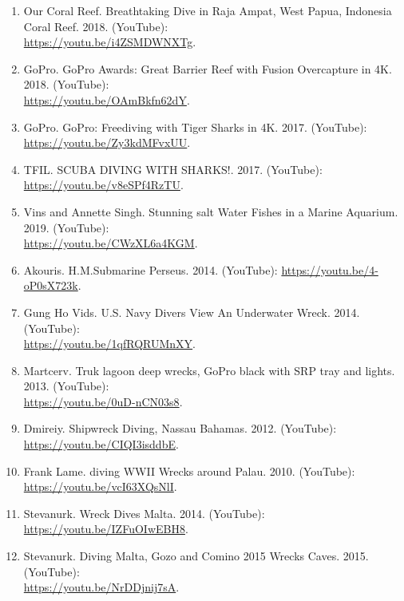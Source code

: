 \documentclass[10pt,twocolumn,letterpaper]{article}
\begin{document}
{\begin{enumerate}
    \item Our Coral Reef. Breathtaking Dive in Raja Ampat, West Papua, Indonesia Coral Reef. 2018. (YouTube): \\
    \url{https://youtu.be/i4ZSMDWNXTg}.
    
    \item GoPro. GoPro Awards: Great Barrier Reef with Fusion Overcapture in 4K. 2018. (YouTube): \\
    \url{https://youtu.be/OAmBkfn62dY}.
    
    \item GoPro. GoPro: Freediving with Tiger Sharks in 4K. 2017. (YouTube): 
    \url{https://youtu.be/Zy3kdMFvxUU}.
    \item TFIL. SCUBA DIVING WITH SHARKS!. 2017. (YouTube):
    \url{https://youtu.be/v8eSPf4RzTU}.
    
    \item Vins and Annette Singh. Stunning salt Water Fishes in a Marine Aquarium. 2019. (YouTube): \\
    \url{https://youtu.be/CWzXL6a4KGM}.
    
\item Akouris. H.M.Submarine Perseus. 2014. (YouTube):
    \url{https://youtu.be/4-oP0sX723k}.
    
    \item Gung Ho Vids. U.S. Navy Divers View An Underwater Wreck. 2014. (YouTube): \\
    \url{https://youtu.be/1qfRQRUMnXY}.
    
    \item Martcerv. Truk lagoon deep wrecks, GoPro black with SRP tray and lights. 2013. (YouTube): \\
    \url{https://youtu.be/0uD-nCN03s8}.
    
    \item Dmireiy. Shipwreck Diving, Nassau Bahamas. 2012. (YouTube):
    \url{https://youtu.be/CIQI3isddbE}.
    
    \item Frank Lame. diving WWII Wrecks around Palau. 2010. (YouTube):
    \url{https://youtu.be/vcI63XQsNlI}.
    
    \item Stevanurk. Wreck Dives Malta. 2014. (YouTube): \\
    \url{https://youtu.be/IZFuOIwEBH8}.
    
    \item Stevanurk. Diving Malta, Gozo and Comino 2015 Wrecks Caves. 2015. (YouTube): \\
    \url{https://youtu.be/NrDDjnij7sA}.
    

\end{enumerate}}
\end{document}

